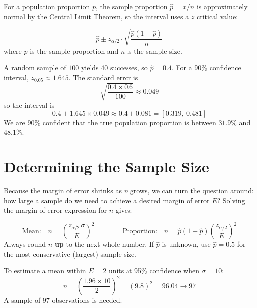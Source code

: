 \documentclass[
  11pt,
  letterpaper,
  DIV=11,
  numbers=noendperiod,
  oneside,
  open=any]{scrreprt}
\begin{document}
For a population proportion \(p\), the sample proportion
\(\hat{p} = x/n\) is approximately normal by the Central Limit Theorem,
so the interval uses a \(z\) critical value:

\begin{bsformula}

\[\hat{p} \pm z_{\alpha/2} \cdot \sqrt{\frac{\hat{p}(1-\hat{p})}{n}}\]
where \(\hat{p}\) is the sample proportion and \(n\) is the sample size.

\end{bsformula}

\begin{bsexample}[Example]

A random sample of \(100\) yields \(40\) successes, so
\(\hat{p} = 0.4\). For a 90\% confidence interval,
\(z_{0.05} \approx 1.645\). The standard error is
\[\sqrt{\frac{0.4 \times 0.6}{100}} \approx 0.049\] so the interval is
\[0.4 \pm 1.645 \times 0.049 \approx 0.4 \pm 0.081 = [0.319,\ 0.481]\]
We are 90\% confident that the true population proportion is between
\(31.9\%\) and \(48.1\%\).

\end{bsexample}

\section{Determining the Sample Size}\label{determining-the-sample-size}

Because the margin of error shrinks as \(n\) grows, we can turn the
question around: how large a sample do we need to achieve a desired
margin of error \(E\)? Solving the margin-of-error expression for \(n\)
gives:

\begin{bsformula}

\[\text{Mean:} \quad n = \left(\frac{z_{\alpha/2}\,\sigma}{E}\right)^2 \qquad\qquad \text{Proportion:} \quad n = \hat{p}(1-\hat{p})\left(\frac{z_{\alpha/2}}{E}\right)^2\]
Always round \(n\) \textbf{up} to the next whole number. If \(\hat{p}\)
is unknown, use \(\hat{p} = 0.5\) for the most conservative (largest)
sample size.

\end{bsformula}

\begin{bsexample}[Example]

To estimate a mean within \(E = 2\) units at 95\% confidence when
\(\sigma = 10\):
\[n = \left(\frac{1.96 \times 10}{2}\right)^2 = (9.8)^2 = 96.04 \rightarrow 97\]
A sample of \(97\) observations is needed.

\end{bsexample}
\end{document}
